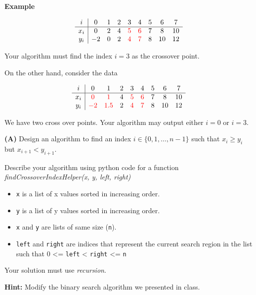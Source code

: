 \documentclass[
]{article}
\providecommand{\tightlist}{%
  \setlength{\itemsep}{0pt}\setlength{\parskip}{0pt}}
\begin{document}
\textbf{Example}

\[\begin{array}{c| c c c c c c c c c }
i & 0 & 1 & 2 & 3 & 4 & 5 & 6 & 7 \\
\hline
x_i & 0 & 2 & 4 & \color{red}{5} & \color{red}{6} & 7 & 8 & 10 \\
y_i & -2 & 0 & 2 & \color{red}{4} & \color{red}{7} & 8 & 10 & 12 \\
\end{array} \]

Your algorithm must find the index \(i=3\) as the crossover point.

On the other hand, consider the data

\[\begin{array}{c| c c c c c c c c c }
i & 0 & 1 & 2 & 3 & 4 & 5 & 6 & 7 \\
\hline
x_i & \color{red}{0} & \color{red}{1} & 4 & \color{red}{5} & \color{red}{6} & 7 & 8 & 10 \\
y_i & \color{red}{-2} & \color{red}{1.5} & 2 & \color{red}{4} & \color{red}{7} & 8 & 10 & 12 \\
\end{array} \]

We have two cross over points. Your algorithm may output either \(i=0\)
or \(i=3\).

\textbf{(A)} Design an algorithm to find an index
\(i \in \{ 0, 1, \ldots, n-1\}\) such that \(x_i \geq y_i\) but
\(x_{i+1} < y_{i+1}\).

Describe your algorithm using python code for a function
\emph{findCrossoverIndexHelper(x, y, left, right)}

\begin{itemize}
\tightlist
\item
  \texttt{x} is a list of x values sorted in increasing order.
\item
  \texttt{y} is a list of y values sorted in increasing order.
\item
  \texttt{x} and \texttt{y} are lists of same size (\texttt{n}).
\item
  \texttt{left} and \texttt{right} are indices that represent the
  current search region in the list such that 0 \textless= \texttt{left}
  \textless{} \texttt{right} \textless= \texttt{n}
\end{itemize}

Your solution must use \emph{recursion}.

\textbf{Hint:} Modify the binary search algorithm we presented in class.
\end{document}
